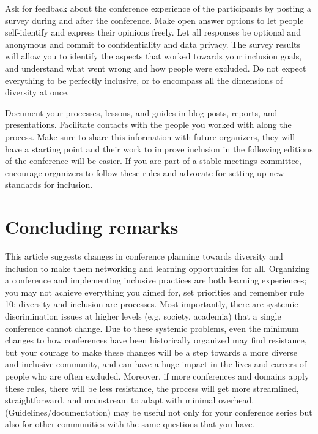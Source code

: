 \documentclass[10pt,letterpaper]{article}
\begin{document}
Ask for feedback about the conference experience of the participants by posting a survey during and after the conference. 
Make open answer options to let people self-identify and express their opinions freely. Let all responses be optional and anonymous and commit to confidentiality and data privacy. 
The survey results will allow you to identify the aspects that worked towards your inclusion goals, and understand what went wrong and how people were excluded.
Do not expect everything to be perfectly inclusive, or to encompass all the dimensions of diversity at once. %

Document your processes, lessons, and guides in blog posts, reports, and presentations. 
Facilitate contacts with the people you worked with along the process. 
Make sure to share this information with future organizers,
they will have a starting point and their work to improve inclusion in the following editions of the conference will be easier.
If you are part of a stable meetings committee, encourage organizers to follow these rules and advocate for setting up new standards for inclusion. 



\section*{Concluding remarks}

This article suggests changes in conference planning towards diversity and inclusion to make them networking and learning opportunities for all. 
Organizing a conference and implementing inclusive practices are both learning experiences;
you may not achieve everything you aimed for, set priorities and remember rule 10: diversity and inclusion are processes. 
Most importantly, there are systemic discrimination issues at higher levels (e.g. society, academia) that a single conference cannot change. 
Due to these systemic problems, even the minimum changes to how conferences have been historically organized may find resistance, but your courage to make these changes will be a step towards a more diverse and inclusive community, and can have a huge impact in the lives and careers of people who are often excluded.
Moreover, if more conferences and domains apply these rules, there will be less resistance, the process will get more streamlined, straightforward, and mainstream to adapt with minimal overhead.
(Guidelines/documentation) may be useful not only for your conference series but also for other communities with the same questions that you have. %
\end{document}
